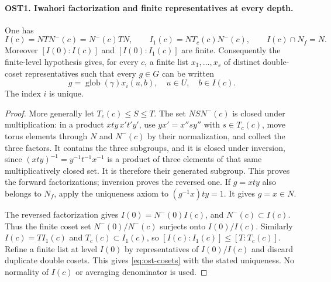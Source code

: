 \documentclass[11pt,a4paper]{article}
\numberwithin{equation}{section}
\theoremstyle{remark}\newtheorem{remark}[theorem]{Remark}
\begin{document}
\paragraph{OST1. Iwahori factorization and finite representatives at every depth.}
\label{claim:OST1}
One has
\[
 I(c)=NTN^-(c)=N^-(c)TN,\qquad
 I_1(c)=NT_c(c)N^-(c),\qquad I(c)\cap N_f=N.
\]
Moreover $[I(0):I(c)]$ and $[I(0):I_1(c)]$ are finite.
Consequently the finite-level hypothesis gives, for every $c$, a
finite list $x_1,\ldots,\allowbreak{} x_s$ of distinct double-coset representatives
such that every $g\in G$ can be written
\begin{equation}\label{eq:ost-cosets}
             g=\operatorname{glob}(\gamma)x_i(u,\allowbreak{} b),
                       \quad u\in U,\quad b\in I(c).
\end{equation}
The index $i$ is unique.
\begin{proof}
More generally let $T_c(c)\leq S\leq T$.  The set $NSN^-(c)$
is closed under multiplication: in a product $xty\,\allowbreak{} x't'y'$, use
$yx'=x''s y''$ with $s\in T_c(c)$, move torus elements through
$N$ and $N^-(c)$ by their normalization, and collect the three
factors.  It contains the three subgroups, and it is closed under
inversion, since $(xty)^{-1}=y^{-1}t^{-1}x^{-1}$ is a product
of three elements of that same multiplicatively closed set.
It is therefore their generated subgroup.  This proves the forward
factorizations; inversion proves the reversed one.  If $g=xty$
also belongs to $N_f$, apply the uniqueness axiom to
$(g^{-1}x)ty=1$.  It gives $g=x\in N$.

The reversed factorization gives $I(0)=N^-(0)I(c)$, and
$N^-(c)\subset I(c)$.  Thus the finite coset set
$N^-(0)/N^-(c)$ surjects onto $I(0)/I(c)$.
Similarly $I(c)=T I_1(c)$ and $T_c(c)\subset I_1(c)$, so
$[I(c):I_1(c)]\leq[T:T_c(c)]$.
Refine a finite list at level $I(0)$ by representatives of
$I(0)/I(c)$ and discard duplicate double cosets.  This gives
\eqref{eq:ost-cosets} with the stated uniqueness.  No normality
of $I(c)$ or averaging denominator is used.
\end{proof}

\end{document}
